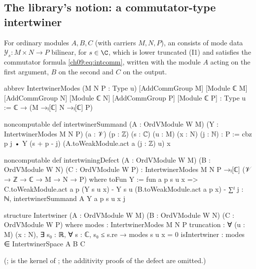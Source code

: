 \subsection{The library's notion: a commutator-type intertwiner}

\begin{definition}\label{ch09:def:intertwiner}
For ordinary modules $A,B,C$ (with carriers $M,N,P$), an  consists of
mode data $\mathcal Y_s\colon M\times N\to P$ bilinear, for $s\in\C$, which is lower truncated
(I1) and satisfies the commutator formula \eqref{ch09:eq:intcomm}, written with the module $A$
acting on the first argument, $B$ on the second and $C$ on the output.
\end{definition}

\begin{leancode}
abbrev IntertwinerModes (M N P : Type u) [AddCommGroup M] [Module ℂ M] [AddCommGroup N]
    [Module ℂ N] [AddCommGroup P] [Module ℂ P] : Type u := ℂ → (M →ₗ[ℂ] N →ₗ[ℂ] P)

noncomputable def intertwinerSummand (A : OrdVModule W M) (Y : IntertwinerModes M N P)
    (a : 𝒱) (p : ℤ) (s : ℂ) (u : M) (x : N) (j : ℕ) : P :=
  cbz p j • Y (s + p - j) (A.toWeakModule.act a (j : ℤ) u) x

noncomputable def intertwiningDefect (A : OrdVModule W M) (B : OrdVModule W N) (C : OrdVModule W P) :
    IntertwinerModes M N P →ₗ[ℂ] (𝒱 → ℤ → ℂ → M → N → P) where
  toFun Y := fun a p s u x =>
    C.toWeakModule.act a p (Y s u x) - Y s u (B.toWeakModule.act a p x)
      - ∑ᶠ j : ℕ, intertwinerSummand A Y a p s u x j

structure Intertwiner (A : OrdVModule W M) (B : OrdVModule W N) (C : OrdVModule W P) where
  modes : IntertwinerModes M N P
  truncation : ∀ (u : M) (x : N), ∃ s₀ : ℝ, ∀ s : ℂ, s₀ ≤ s.re → modes s u x = 0
  isIntertwiner : modes ∈ IntertwinerSpace A B C
\end{leancode}
(;  is the kernel of
; the additivity proofs of the defect are omitted.)

